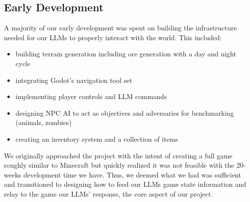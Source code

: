 \documentclass{article}
\begin{document}
\subsection{Early Development}
A majority of our early development was spent on building the infrastructure needed for our LLMs to properly interact with the world.
This included: 
\begin{itemize}
    \item building terrain generation including ore generation with a day and night cycle
    \item integrating Godot's navigation tool set
    \item implementing player controls and LLM commands 
    \item designing NPC AI to act as objectives and adversaries for benchmarking (animals, zombies)
    \item creating an inventory system and a collection of items
\end{itemize}
We originally approached the project with the intent of creating a full game roughly similar to Minecraft but quickly realized it was not feasible with the 20-weeks development time we have.
Thus, we deemed what we had was sufficient and transitioned to designing how to feed our LLMs game state information and relay to the game our LLMs' response, the core aspect of our project.
\end{document}
